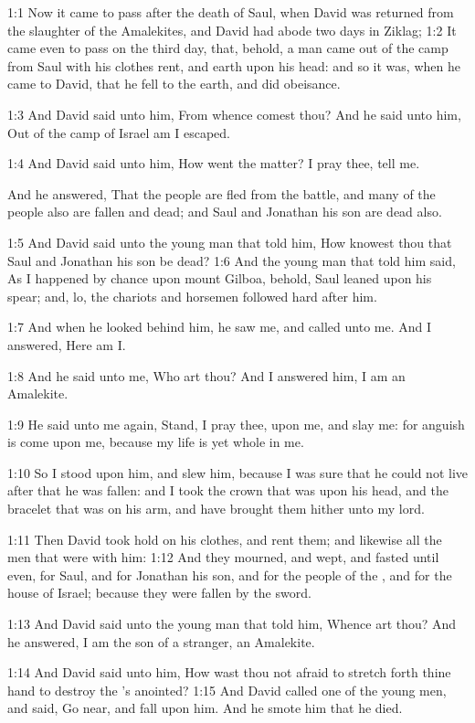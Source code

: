 
1:1 Now it came to pass after the death of Saul, when David was returned from the slaughter of the Amalekites, and David had abode two days in Ziklag; 1:2 It came even to pass on the third day, that, behold, a man came out of the camp from Saul with his clothes rent, and earth upon his head: and so it was, when he came to David, that he fell to the earth, and did obeisance.

1:3 And David said unto him, From whence comest thou? And he said unto him, Out of the camp of Israel am I escaped.

1:4 And David said unto him, How went the matter? I pray thee, tell me.

And he answered, That the people are fled from the battle, and many of the people also are fallen and dead; and Saul and Jonathan his son are dead also.

1:5 And David said unto the young man that told him, How knowest thou that Saul and Jonathan his son be dead?  1:6 And the young man that told him said, As I happened by chance upon mount Gilboa, behold, Saul leaned upon his spear; and, lo, the chariots and horsemen followed hard after him.

1:7 And when he looked behind him, he saw me, and called unto me. And I answered, Here am I.

1:8 And he said unto me, Who art thou? And I answered him, I am an Amalekite.

1:9 He said unto me again, Stand, I pray thee, upon me, and slay me: for anguish is come upon me, because my life is yet whole in me.

1:10 So I stood upon him, and slew him, because I was sure that he could not live after that he was fallen: and I took the crown that was upon his head, and the bracelet that was on his arm, and have brought them hither unto my lord.

1:11 Then David took hold on his clothes, and rent them; and likewise all the men that were with him: 1:12 And they mourned, and wept, and fasted until even, for Saul, and for Jonathan his son, and for the people of the \LORD, and for the house of Israel; because they were fallen by the sword.

1:13 And David said unto the young man that told him, Whence art thou?  And he answered, I am the son of a stranger, an Amalekite.

1:14 And David said unto him, How wast thou not afraid to stretch forth thine hand to destroy the \LORD's anointed?  1:15 And David called one of the young men, and said, Go near, and fall upon him. And he smote him that he died.

